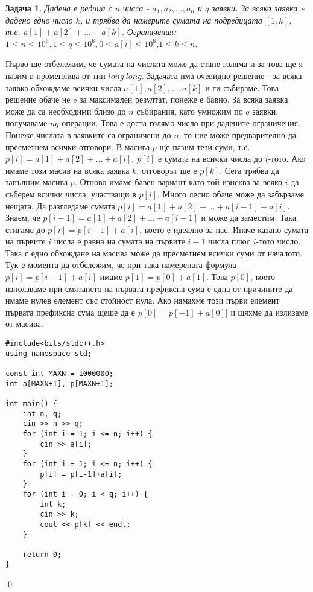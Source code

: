 \documentclass[]{article}
\newtheorem{problem}{Задача}
\newenvironment{solution}{\noindent{\bf Решение.}\hspace*{1em}}{\qed\par}
\begin{document}
\begin{problem}
Дадена е редица с $n$ числа - $a_1,a_2,...,a_n$ и $q$ заявки. За всяка заявка e дадено едно число $k$, и трябва да намерите сумата на подредицата $[1,k]$, т.е. $a[1]+a[2]+...+a[k]$.\newline
Ограничения: $1\leq n\leq 10^6,1\leq q\leq 10^6,0 \leq a[i]\leq 10^6$,$1\leq k\leq n$.
\end{problem}
\begin{solution}
Първо ще отбележим, че сумата на числата може да стане голяма и за това ще я пазим в променлива от тип $long\ long$.\newline
Задачата има очевидно решение - за всяка заявка обхождаме всички числа $a[1],a[2],...,a[k]$ и ги събираме. Това решение обаче не e за максимален резултат, понеже е бавно. За всяка заявка може да са необходими близо до $n$ събирания, като умножим по $q$ заявки, получаваме $nq$ операции. Това е доста голямо число при дадените ограничения.\newline
Понеже числата в заявките са ограничени до $n$, то ние може предварително да пресметнем всички отговори. В масива $p$ ще пазим тези суми, т.е. $p[i]=a[1]+a[2]+...+a[i]$, $p[i]$ е сумата на всички числа до $i$-тото. Ако имаме този масив на всяка заявка $k$, отговорът ще е $p[k]$.\newline
Сега трябва да запълним масива $p$. Отново имаме бавен вариант като той изисква за всяко $i$ да съберем всички числа, участващи в $p[i]$.\newline
Много лесно обаче може да забързаме нещата. Да разгледаме сумата $p[i]=a[1]+a[2]+...+a[i-1]+a[i]$. 
Знаем, че $p[i-1]=a[1]+a[2]+...+a[i-1]$ и може да заместим. Така стигаме до $p[i]=p[i-1]+a[i]$, което е идеално за нас. Иначе казано сумата на първите $i$ числа е равна на сумата на първите $i-1$ числа плюс $i$-тото число. Така с едно обхождане на масива може да пресметнем всички суми от началото.\newline
Тук е момента да отбележим, че при така намерената формула $p[i]=p[i-1]+a[i]$ имаме $p[1]=p[0]+a[1]$. Това $p[0]$, което използваме при смятането на първата префиксна сума е една от причините да имаме нулев елемент със стойност нула. Ако нямахме този първи елемент първата префиксна сума щеше да е $p[0]=p[-1]+a[0]]$ и щяхме да излизаме от масива.

\begin{verbatim}
#include<bits/stdc++.h>
using namespace std;

const int MAXN = 1000000;
int a[MAXN+1], p[MAXN+1];

int main() {
    int n, q;
    cin >> n >> q;
    for (int i = 1; i <= n; i++) {
        cin >> a[i];
    }
    for (int i = 1; i <= n; i++) {
        p[i] = p[i-1]+a[i];
    }
    for (int i = 0; i < q; i++) {
        int k;
        cin >> k;
        cout << p[k] << endl;
    }

    return 0;
}
\end{verbatim}
\end{solution}
\end{document}
